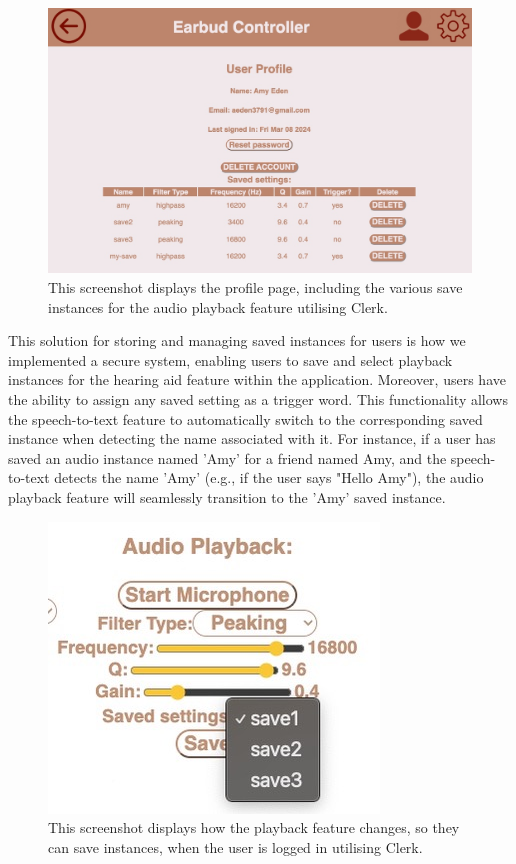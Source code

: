 \documentclass{l4proj}
\begin{document}
\begin{figure}
    \centering
    \includegraphics[width=0.9\linewidth]{dissertation/images/profile.jpeg} 
    \caption{This screenshot displays the profile page, including the various save instances for the audio playback feature utilising Clerk.}
    \label{fig:profile} 
\end{figure}

This solution for storing and managing saved instances for users is how we implemented a secure system, enabling users to save and select playback instances for the hearing aid feature within the application. Moreover, users have the ability to assign any saved setting as a trigger word. This functionality allows the speech-to-text feature to automatically switch to the corresponding saved instance when detecting the name associated with it. For instance, if a user has saved an audio instance named 'Amy' for a friend named Amy, and the speech-to-text detects the name 'Amy' (e.g., if the user says "Hello Amy"), the audio playback feature will seamlessly transition to the 'Amy' saved instance.

\begin{figure}
    \centering
    \includegraphics[width=0.4\linewidth]{dissertation/images/saves.jpeg} 
    \caption{This screenshot displays how the playback feature changes, so they can save instances, when the user is logged in utilising Clerk.}
    \label{fig:saves} 
\end{figure}
\end{document}
